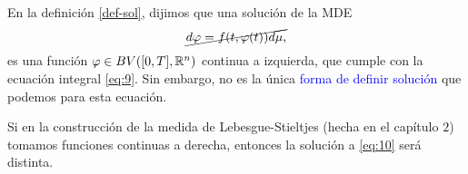 En la definición  \ref{def-sol}, dijimos que una solución de la MDE \added{\eqref{eq:10}}
{\color{red}
\begin{equation*}
	\cancel{d\varphi=f(t,\varphi(t))d\mu,}
\end{equation*}
}
es una función $\varphi\in BV([0,T],\mathbb{R}^n)$  continua a izquierda, que cumple con la ecuación integral \eqref{eq:9}. Sin embargo, no es la única \textcolor{blue}{forma de definir  solución}  que podemos  para esta ecuación. 

 Si en la construcción de la medida de Lebesgue-Stieltjes (hecha en el capítulo $2$) tomamos funciones continuas a derecha, entonces la solución a \eqref{eq:10} será distinta\reversemarginpar{}. 


